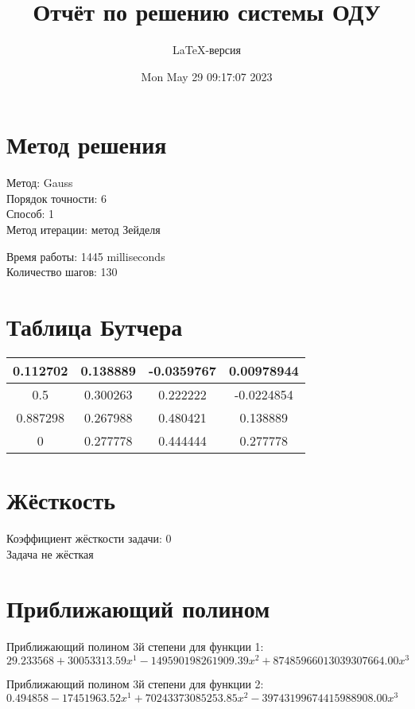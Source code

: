 \documentclass[a4paper,14pt]{extarticle}
\title{Отчёт по решению системы ОДУ}
\author{LaTeX-версия}
\date{Mon May 29 09:17:07 2023}
\begin{document}
\maketitle

\tableofcontents
\pagebreak

\section{Метод решения}

Метод: Gauss\\
Порядок точности: 6\\
Способ: 1\\
Метод итерации: метод Зейделя

Время работы: 1445 milliseconds\\
Количество шагов: 130\\
\section{Таблица Бутчера}

\begin{table}[h]
\centering
\begin{tabular}{|c||c|c|c|}
\hline
0.112702 & 0.138889 & -0.0359767 & 0.00978944\\
\hline
0.5 & 0.300263 & 0.222222 & -0.0224854\\
\hline
0.887298 & 0.267988 & 0.480421 & 0.138889\\
\hline
0 & \cellcolor{lightgray} 0.277778 & \cellcolor{lightgray} 0.444444 & \cellcolor{lightgray} 0.277778\\
\hline
\end{tabular}
\end{table}

\section{Жёсткость}

Коэффициент жёсткости задачи: 0\\
Задача не жёсткая

\section{Приближающий полином}

Приближающий полином 3й степени для функции 1: $29.233568 + 30053313.59x^1 - 149590198261909.39x^2 + 87485966013039307664.00x^3$

Приближающий полином 3й степени для функции 2: $0.494858 - 17451963.52x^1 + 70243373085253.85x^2 - 39743199674415988908.00x^3$
\end{document}
